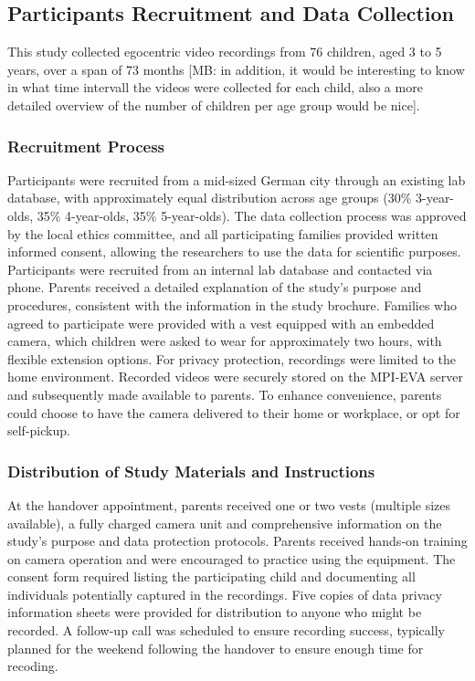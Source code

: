 \documentclass[
  man,floatsintext]{apa6}
\begin{document}
\subsection{Participants Recruitment and Data Collection}\label{sup-participants}

This study collected egocentric video recordings from 76 children, aged 3 to 5 years, over a span of 73 months {[}MB: in addition, it would be interesting to know in what time intervall the videos were collected for each child, also a more detailed overview of the number of children per age group would be nice{]}.

\subsubsection{Recruitment Process}\label{recruitment-process-1}

Participants were recruited from a mid-sized German city through an existing lab database, with approximately equal distribution across age groups (30\% 3-year-olds, 35\% 4-year-olds, 35\% 5-year-olds). The data collection process was approved by the local ethics committee, and all participating families provided written informed consent, allowing the researchers to use the data for scientific purposes. Participants were recruited from an internal lab database and contacted via phone. Parents received a detailed explanation of the study's purpose and procedures, consistent with the information in the study brochure. Families who agreed to participate were provided with a vest equipped with an embedded camera, which children were asked to wear for approximately two hours, with flexible extension options. For privacy protection, recordings were limited to the home environment. Recorded videos were securely stored on the MPI-EVA server and subsequently made available to parents. To enhance convenience, parents could choose to have the camera delivered to their home or workplace, or opt for self-pickup.

\subsubsection{Distribution of Study Materials and Instructions}\label{distribution-of-study-materials-and-instructions-1}

At the handover appointment, parents received one or two vests (multiple sizes available), a fully charged camera unit and comprehensive information on the study's purpose and data protection protocols. Parents received hands-on training on camera operation and were encouraged to practice using the equipment. The consent form required listing the participating child and documenting all individuals potentially captured in the recordings. Five copies of data privacy information sheets were provided for distribution to anyone who might be recorded. A follow-up call was scheduled to ensure recording success, typically planned for the weekend following the handover to ensure enough time for recoding.
\end{document}
